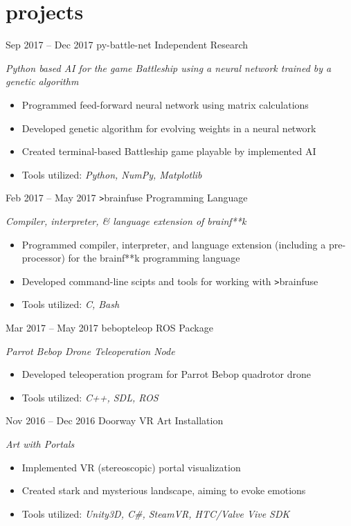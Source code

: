 \documentclass[]{friggeri-cv}
\begin{document}
\section{projects}
\begin{entrylist}
    \entry
      {Sep 2017 -- Dec 2017}
      {py-battle-net}
      {Independent Research}
      {\emph{Python based AI for the game Battleship using a neural network trained by a genetic algorithm}
      \begin{itemize}[leftmargin=1.2em]
      \item Programmed feed-forward neural network using matrix calculations
      \item Developed genetic algorithm for evolving weights in a neural network
      \item Created terminal-based Battleship game playable by implemented AI
      \item Tools utilized: \emph{Python, NumPy, Matplotlib}
      \end{itemize}}
  \entry
    {Feb 2017 -- May 2017}
    {\texttt{>}brainfuse}
    {Programming Language}
    {\emph{Compiler, interpreter, \& language extension of brainf**k}
    \begin{itemize}[leftmargin=1.2em]
    \item Programmed compiler, interpreter, and language extension (including a pre-processor) for the brainf**k programming language
    \item Developed command-line scipts and tools for working with \texttt{>}brainfuse
    \item Tools utilized: \emph{C, Bash}
    \end{itemize}}
  \entry
    {Mar 2017 -- May 2017}
    {bebop\textunderscore teleop}
    {ROS Package}
    {\emph{Parrot Bebop Drone Teleoperation Node}
    \begin{itemize}[leftmargin=1.2em]
    \item Developed teleoperation program for Parrot Bebop quadrotor drone
    \item Tools utilized: \emph{C++, SDL, ROS}
    \end{itemize}}
  \entry
    {Nov 2016 -- Dec 2016}
    {Doorway}
    {VR Art Installation}
    {\emph{Art with Portals}
    \begin{itemize}[leftmargin=1.2em]
    \item Implemented VR (stereoscopic) portal visualization
    \item Created stark and mysterious landscape, aiming to evoke emotions
    \item Tools utilized: \emph{Unity3D, C\#,  SteamVR, HTC/Valve Vive SDK}
    \end{itemize}}
\end{entrylist}
\end{document}
